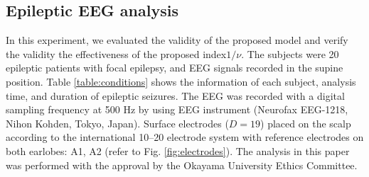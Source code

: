 \documentclass[journal]{IEEEtran}
\begin{document}
\subsection{Epileptic EEG analysis}
In this experiment, we evaluated the validity of the proposed model and verify the validity the effectiveness of the proposed index$1/\nu$.
The subjects were 20 epileptic patients with focal epilepsy, and EEG signals recorded in the supine position.
Table \ref{table:conditions} shows the information of each subject, analysis time, and duration of epileptic seizures.
The EEG was recorded with a digital sampling frequency at 500 Hz by using EEG instrument (Neurofax EEG-1218, Nihon Kohden, Tokyo, Japan). Surface electrodes ($D=19$) placed on the scalp according to the international 10--20 electrode system with reference electrodes on both earlobes: A1, A2 (refer to Fig. \ref{fig:electrodes}).
The analysis in this paper was performed with the approval by the Okayama University Ethics Committee.
\end{document}
